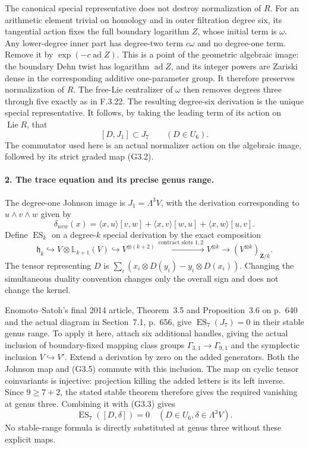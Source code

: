 The canonical special representative does not destroy
normalization of $R$. For an arithmetic element trivial
on homology and in outer filtration degree six, its
tangential action fixes the full boundary logarithm
$Z$, whose initial term is $\omega$. Any lower-degree
inner part has degree-two term $c\omega$ and no
degree-one term. Remove it by $\exp(-c\operatorname{ad}Z)$.
This is a point of the geometric algebraic image: the
boundary Dehn twist has logarithm
$\operatorname{ad}Z$, and its integer powers are
Zariski dense in the corresponding additive one-parameter
group. It therefore preserves normalization of $R$.
The free-Lie centralizer of $\omega$ then removes
degrees three through five exactly as in F.3.22.
The resulting degree-six derivation is the unique
special representative. It follows, by taking the
leading term of its action on $\operatorname{Lie}R$, that
\[
                       [D,J_1]\subset J_7
                       \qquad(D\in U_6).                  \tag{G3.3}
\]
The commutator used here is an actual normalizer action
on the algebraic image, followed by its strict graded
map (G3.2).

\paragraph{2. The trace equation and its precise genus range.}
The degree-one Johnson image is
$J_1=\Lambda^3V$, with the derivation corresponding to
$u\wedge v\wedge w$ given by
\[
 \delta_{uvw}(x)=\langle x,u\rangle[v,w]
                +\langle x,v\rangle[w,u]
                +\langle x,w\rangle[u,v].                 \tag{G3.4}
\]
Define $\operatorname{ES}_k$ on a degree-$k$ special
derivation by the exact composition
\[
 \mathfrak h_k\hookrightarrow V\otimes\mathbb L_{k+1}(V)
 \hookrightarrow V^{\otimes(k+2)}
 \xrightarrow{\,\text{contract slots }1,2\,}V^{\otimes k}
 \longrightarrow (V^{\otimes k})_{\mathbf Z/k}.             \tag{G3.5}
\]
The tensor representing $D$ is
$\sum_i(x_i\otimes D(y_i)-y_i\otimes D(x_i))$.
Changing the simultaneous duality convention changes
only the overall sign and does not change the kernel.

Enomoto--Satoh's final 2014 article, Theorem~3.5 and
Proposition~3.6 on p.~640 and the actual diagram in
Section~7.1, p.~656, give
$\operatorname{ES}_7(J_7)=0$ in their stable genus
range. To apply it here, attach six additional handles,
giving the actual inclusion of boundary-fixed mapping
class groups $\Gamma_{3,1}\to\Gamma_{9,1}$ and the
symplectic inclusion $V\hookrightarrow V'$. Extend a
derivation by zero on the added generators. Both the
Johnson map and (G3.5) commute with this inclusion.
The map on cyclic tensor coinvariants is injective:
projection killing the added letters is its left
inverse. Since $9\geq7+2$, the stated stable theorem
therefore gives the required vanishing at genus three.
Combining it with (G3.3) gives
\[
       \operatorname{ES}_7([D,\delta])=0
       \quad(D\in U_6, \delta\in\Lambda^3V).              \tag{G3.6}
\]
No stable-range formula is directly substituted at
genus three without these explicit maps.


